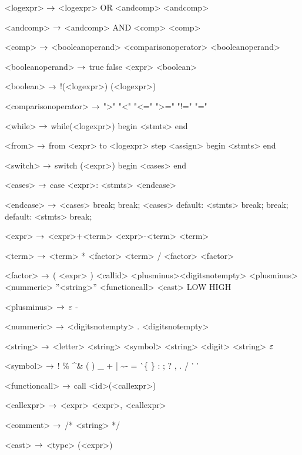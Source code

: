 \begin{grammar}
<logexpr> $\rightarrow$ <logexpr> OR <andcomp>
		\alt <andcomp>

<andcomp> $\rightarrow$ <andcomp> AND <comp>

<comp> $\rightarrow$ <booleanoperand> <comparisonoperator> <booleanoperand>

<booleanoperand> $\rightarrow$ true
		\alt false
		\alt <boolean>

<boolean> $\rightarrow$ !(<logexpr>)
		\alt (<logexpr>)

<comparisonoperator> $\rightarrow$ ">"
				\alt "<"
				\alt "<="
				\alt ">="
				\alt "!="
				\alt "="

<while> $\rightarrow$ while(<logexpr>)
		begin
			<stmts>
		end
		
<from> $\rightarrow$ from <expr> to <logexpr> step <assign>
	begin
		<stmts>
	end

<switch> $\rightarrow$ switch (<expr>)
		begin
			<cases>
		end

<cases> $\rightarrow$ case <expr>:
			<stmts>
		<endcase>
		
<endcase> $\rightarrow$ <cases>
		\alt break;
		\alt break;
		<cases>
		\alt default:
			<stmts>
			break;
		\alt break;
		default:
			<stmts>
			break;

<expr> $\rightarrow$ <expr>+<term>
	\alt<expr>-<term>
	\alt<term>

<term> $\rightarrow$ <term> * <factor>
	\alt <term> / <factor>
	\alt <factor>

<factor> $\rightarrow$ ( <expr> )
	\alt <callid>
	\alt <plusminus><digitsnotempty>
	\alt <plusminus><nummeric>
	\alt ''<string>''
	\alt <functioncall> 
	\alt <cast>
	\alt LOW
	\alt HIGH

<plusminus> $\rightarrow$ $\varepsilon$
	\alt -

<nummeric> $\rightarrow$ <digitsnotempty> . <digitsnotempty>

<string> $\rightarrow$ <letter> <string>
\alt <symbol> <string>
\alt <digit> <string>
\alt $\varepsilon$

<symbol> $\rightarrow$ !
\alt \%
\alt \^
\alt \&
\alt *
\alt (
\alt )
\alt \_
\alt +
\alt |
\alt \~
\alt -
\alt =
\alt \`
\alt \{
\alt \}
\alt [
\alt ]
\alt :
\alt ;
\alt ?
\alt ,
\alt .
\alt /
\alt ' '

<functioncall> $\rightarrow$ call <id>(<callexpr>)

<callexpr> $\rightarrow$ <expr>
\alt <expr>, <callexpr>

<comment> $\rightarrow$ /* <string> */

<cast> $\rightarrow$ <type> (<expr>)

\end{grammar}